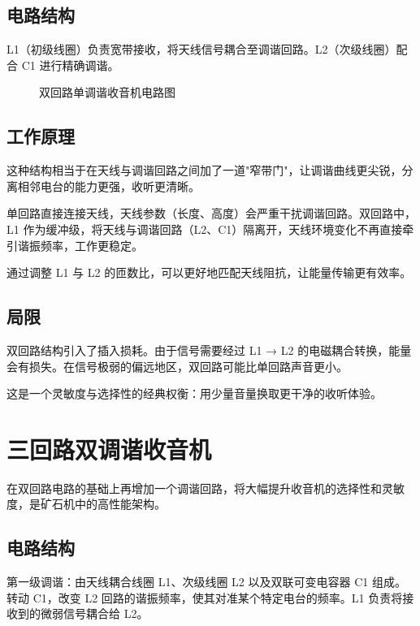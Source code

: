 \documentclass[12pt,UTF8]{ctexbook}
\begin{document}
\subsection{电路结构}

L1（初级线圈）负责宽带接收，将天线信号耦合至调谐回路。L2（次级线圈）配合 C1 进行精确调谐。

\begin{figure}[H]
	\centering
	\caption{双回路单调谐收音机电路图}
	\label{fig:double-loop-circuit}
\end{figure}

\subsection{工作原理}

这种结构相当于在天线与调谐回路之间加了一道"窄带门"，让调谐曲线更尖锐，分离相邻电台的能力更强，收听更清晰。

单回路直接连接天线，天线参数（长度、高度）会严重干扰调谐回路。双回路中，L1 作为缓冲级，将天线与调谐回路（L2、C1）隔离开，天线环境变化不再直接牵引谐振频率，工作更稳定。

通过调整 L1 与 L2 的匝数比，可以更好地匹配天线阻抗，让能量传输更有效率。

\subsection{局限}

双回路结构引入了插入损耗。由于信号需要经过 L1 → L2 的电磁耦合转换，能量会有损失。在信号极弱的偏远地区，双回路可能比单回路声音更小。

这是一个灵敏度与选择性的经典权衡：用少量音量换取更干净的收听体验。


\section{三回路双调谐收音机}

在双回路电路的基础上再增加一个调谐回路，将大幅提升收音机的选择性和灵敏度，是矿石机中的高性能架构。

\subsection{电路结构}

第一级调谐：由天线耦合线圈 L1、次级线圈 L2 以及双联可变电容器 C1 组成。转动 C1，改变 L2 回路的谐振频率，使其对准某个特定电台的频率。L1 负责将接收到的微弱信号耦合给 L2。
\end{document}
